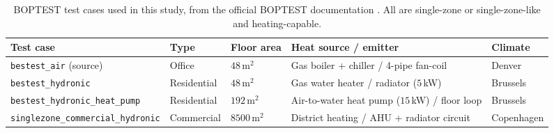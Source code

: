 \begin{table}[H]
\centering
\caption{BOPTEST test cases used in this study, from the official BOPTEST documentation \citep{Blum2021BOPTEST}. All are single-zone or single-zone-like and heating-capable.}
\label{tab:testcases}
\footnotesize
\begin{tabularx}{\linewidth}{@{}l l l X l@{}}
\toprule
Test case & Type & Floor area & Heat source / emitter & Climate \\
\midrule
\texttt{bestest\_air} (source) & Office & $48$\,m$^2$ & Gas boiler + chiller / 4-pipe fan-coil & Denver \\
\texttt{bestest\_hydronic} & Residential & $48$\,m$^2$ & Gas water heater / radiator ($5$\,kW) & Brussels \\
\texttt{bestest\_hydronic\_heat\_pump} & Residential & $192$\,m$^2$ & Air-to-water heat pump ($15$\,kW) / floor loop & Brussels \\
\texttt{singlezone\_commercial\_hydronic} & Commercial & $8500$\,m$^2$ & District heating / AHU + radiator circuit & Copenhagen \\
\bottomrule
\end{tabularx}
\end{table}


